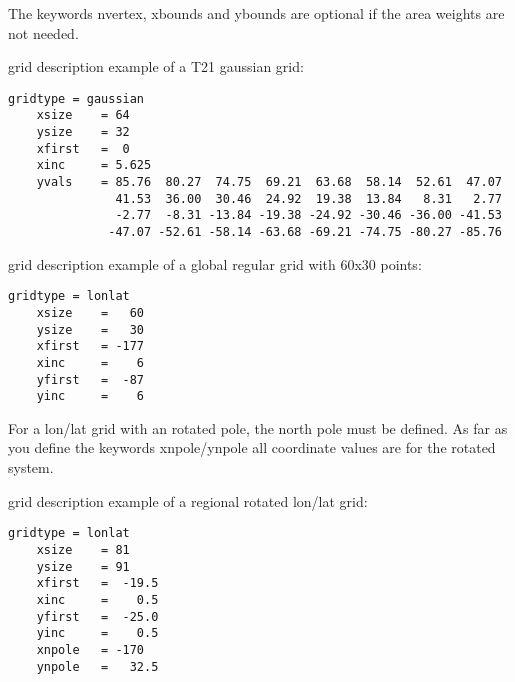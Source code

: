 \vspace{3mm}

The keywords nvertex, xbounds and ybounds are optional if the area weights are not needed.

\vspace{2mm}

\CDO grid description example of a T21 gaussian grid:
\begin{lstlisting}[frame=single, backgroundcolor=\color{zebg}, basicstyle=\footnotesize]
    gridtype = gaussian
    xsize    = 64
    ysize    = 32
    xfirst   =  0
    xinc     = 5.625
    yvals    = 85.76  80.27  74.75  69.21  63.68  58.14  52.61  47.07
               41.53  36.00  30.46  24.92  19.38  13.84   8.31   2.77
               -2.77  -8.31 -13.84 -19.38 -24.92 -30.46 -36.00 -41.53
              -47.07 -52.61 -58.14 -63.68 -69.21 -74.75 -80.27 -85.76
\end{lstlisting}

\vspace{2mm}

\CDO grid description example of a global regular grid with 60x30 points:
\begin{lstlisting}[frame=single, backgroundcolor=\color{zebg}, basicstyle=\footnotesize]
    gridtype = lonlat
    xsize    =   60
    ysize    =   30
    xfirst   = -177
    xinc     =    6
    yfirst   =  -87
    yinc     =    6
\end{lstlisting}

\vspace{2mm}

For a lon/lat grid with an rotated pole, the north pole must be defined.
As far as you define the keywords xnpole/ynpole all coordinate values
are for the rotated system.

\vspace{2mm}

\CDO grid description example of a regional rotated lon/lat grid:
\begin{lstlisting}[frame=single, backgroundcolor=\color{zebg}, basicstyle=\footnotesize]
    gridtype = lonlat
    xsize    = 81
    ysize    = 91
    xfirst   =  -19.5
    xinc     =    0.5
    yfirst   =  -25.0
    yinc     =    0.5
    xnpole   = -170
    ynpole   =   32.5
\end{lstlisting}

